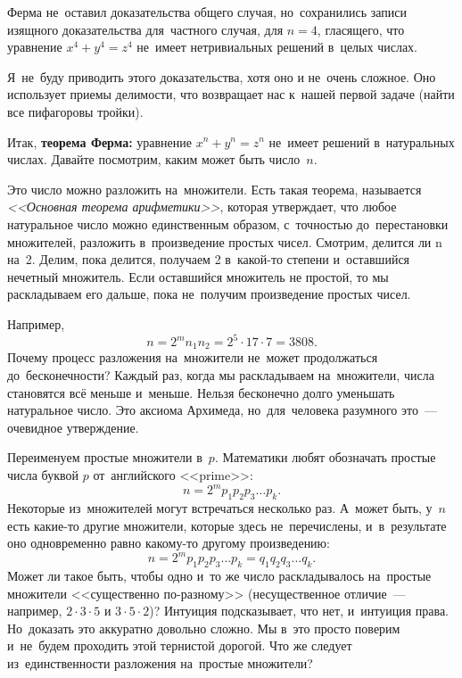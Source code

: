Ферма не~оставил доказательства общего случая, но~сохранились записи изящного доказательства
для~частного случая, для $n=4$, гласящего, что уравнение $x^{4}+y^{4}=z^{4}$ не~имеет нетривиальных решений в~целых числах.

Я~не~буду приводить этого доказательства, хотя оно и не~очень сложное. Оно использует приемы делимости, что
возвращает нас к~нашей первой задаче (найти все пифагоровы тройки).


Итак, \textbf{теорема Ферма:} уравнение $x^{n}+y^{n}=z^{n}$ не~имеет решений в~натуральных числах. Давайте посмотрим, каким
может быть число~$n$.

Это число можно разложить на~множители. Есть такая теорема, называется \textit{<<Основная теорема
арифметики>>}, которая утверждает, что любое натуральное число можно единственным образом,
с~точностью до~перестановки множителей, разложить в~произведение простых чисел. Смотрим, делится ли
n на~2. Делим, пока делится, получаем 2 в~какой-то степени и~оставшийся нечетный множитель. Если
оставшийся множитель не простой, то мы раскладываем его дальше, пока не~получим произведение простых чисел.


Например,
$$
n=2^{m}n_{1}n_{2} = 2^{5}\cdot 17\cdot 7 = 3808.
$$
Почему процесс разложения на~множители не~может продолжаться до~бесконечности? Каждый раз, когда мы
раскладываем на~множители, числа становятся всё меньше и~меньше. Нельзя бесконечно долго уменьшать
натуральное число. Это аксиома Архимеда, но~для~человека разумного это~--- очевидное
утверждение.


\pagebreak


Переименуем простые множители в~$p$. Математики любят обозначать простые числа буквой $p$ от~английского
<<prime>>:
$$
n=2^{m}p_{1}p_{2}p_{3}\ldots p_{k}.
$$
Некоторые из~множителей могут встречаться несколько раз. А~может быть, у~$n$ есть какие-то другие
множители, которые здесь не~перечислены, и~в~результате оно одновременно равно какому-то другому произведению:
$$
n=2^{m}p_{1}p_{2}p_{3}\ldots p_{k}=q_{1}q_{2}q_{3}\ldots q_{k}.
$$
Может ли такое быть, чтобы одно и~то же число раскладывалось на~простые множители <<существенно
по-разному>> (несущественное отличие~--- например, $2\cdot 3 \cdot 5$ и $3\cdot 5 \cdot 2$)?
 Интуиция подсказывает, что нет,
и~интуиция права. Но~доказать это аккуратно довольно сложно. Мы в~это просто поверим и~не~будем проходить
этой тернистой дорогой.
 Что же следует из~единственности разложения на~простые множители?


